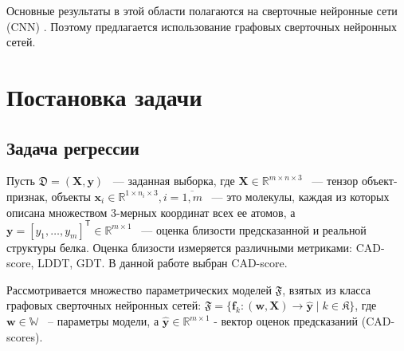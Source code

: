 \documentclass[12pt,twosides]{article}
\begin{document}
	
	
	Основные результаты в этой области полагаются на сверточные нейронные сети (CNN) \cite{10.1093/bioinformatics/btz122}. Поэтому предлагается использование графовых сверточных нейронных сетей. 
	
	

	
	\section{Постановка задачи}
	
	\subsection{Задача регрессии}
	Пусть $\mathfrak{D} = (\mathbf{X}, \mathbf{y})$ ~--- заданная выборка, где $\mathbf{X}\in \mathbb{R}^{m\times n\times 3}$ ~--- тензор объект-признак, объекты $\mathbf{x}_i\in \mathbb{R}^{1\times n_i\times 3}, i=\overline{1,m}$ ~--- это молекулы, каждая из которых описана множеством 3-мерных координат всех ее атомов, а $\mathbf{y} = [y_1,\dots, y_m]^{\mathsf{T}}\in \mathbb{R}^{m\times 1}$ ~--- оценка близости предсказанной и реальной структуры белка. Оценка близости измеряется различными метриками: CAD-score\cite{Olechnovic2013CADscoreAN}, LDDT, GDT. В данной работе выбран CAD-score. 
	
	Рассмотривается множество параметрических моделей $\mathfrak{F}$, взятых из класса графовых сверточных нейронных сетей: $\mathfrak{F} = \{\mathbf{f}_k\colon(\mathbf{w}, \mathbf{X})\to  \mathbf{\hat{y}}\mid k \in \mathfrak{K}\}$, где $\mathbf{w} \in \mathbb{W}$ ~-- параметры модели, а $\hat{\mathbf{y}}\in \mathbb{R}^{m\times 1}$ - вектор оценок предсказаний (CAD-scores). 
	
\end{document}

